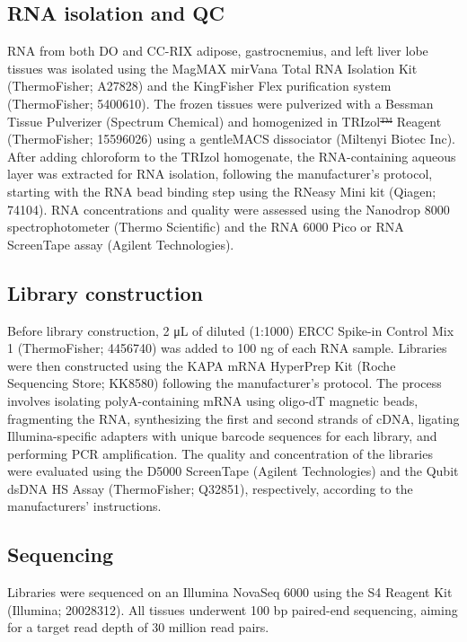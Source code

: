 \documentclass[
]{article}
\providecommand{\DIFaddtex}[1]{{\protect\color{blue}\uwave{#1}}} %
\providecommand{\DIFdeltex}[1]{{\protect\color{red}\sout{#1}}}                      %
\providecommand{\DIFaddbegin}{} %
\providecommand{\DIFaddend}{} %
\providecommand{\DIFdelbegin}{} %
\providecommand{\DIFdelend}{} %
\providecommand{\DIFadd}[1]{\texorpdfstring{\DIFaddtex{#1}}{#1}} %
\providecommand{\DIFdel}[1]{\texorpdfstring{\DIFdeltex{#1}}{}} %
\newcommand{\DIFscaledelfig}{0.5}
\newlength{\DIFdelgraphicswidth} %
\newlength{\DIFdelgraphicsheight} %
\newcommand{\DIFaddincludegraphics}[2][]{{\color{blue}\fbox{\DIFOincludegraphics[#1]{#2}}}} %
\newcommand{\DIFdelincludegraphics}[2][]{%
\sbox{\DIFdelgraphicsbox}{\DIFOincludegraphics[#1]{#2}}%
\settoboxwidth{\DIFdelgraphicswidth}{\DIFdelgraphicsbox} %
\settoboxtotalheight{\DIFdelgraphicsheight}{\DIFdelgraphicsbox} %
\scalebox{\DIFscaledelfig}{%
\parbox[b]{\DIFdelgraphicswidth}{\usebox{\DIFdelgraphicsbox}\\[-\baselineskip] \rule{\DIFdelgraphicswidth}{0em}}\llap{\resizebox{\DIFdelgraphicswidth}{\DIFdelgraphicsheight}{%
\setlength{\unitlength}{\DIFdelgraphicswidth}%
\begin{picture}(1,1)%
\thicklines\linethickness{2pt} %
{\color[rgb]{1,0,0}\put(0,0){\framebox(1,1){}}}%
{\color[rgb]{1,0,0}\put(0,0){\line( 1,1){1}}}%
{\color[rgb]{1,0,0}\put(0,1){\line(1,-1){1}}}%
\end{picture}%
}\hspace*{3pt}}} %
} %
\DeclareRobustCommand{\DIFaddbegin}{\DIFOaddbegin \let\includegraphics\DIFaddincludegraphics} %
\DeclareRobustCommand{\DIFaddend}{\DIFOaddend \let\includegraphics\DIFOincludegraphics} %
\DeclareRobustCommand{\DIFdelbegin}{\DIFOdelbegin \let\includegraphics\DIFdelincludegraphics} %
\DeclareRobustCommand{\DIFdelend}{\DIFOaddend \let\includegraphics\DIFOincludegraphics} %
\begin{document}
\subsection{RNA isolation and QC}\label{rna-isolation-and-qc}

RNA from both DO and CC-RIX adipose, gastrocnemius, and left liver lobe
tissues was isolated using the MagMAX mirVana Total RNA Isolation Kit
(ThermoFisher; A27828) and the KingFisher Flex purification system
(ThermoFisher; 5400610). The frozen tissues were pulverized with a
Bessman Tissue Pulverizer (Spectrum Chemical) and homogenized in
TRIzol\DIFdelbegin \DIFdel{™
}\DIFdelend \DIFaddbegin \DIFadd{\textsuperscript{\texttrademark} }\DIFaddend Reagent (ThermoFisher; 15596026)
using a gentleMACS dissociator (Miltenyi Biotec Inc). After adding
chloroform to the TRIzol homogenate, the RNA-containing aqueous layer
was extracted for RNA isolation, following the manufacturer's protocol,
starting with the RNA bead binding step using the RNeasy Mini kit
(Qiagen; 74104). RNA concentrations and quality were assessed using the
Nanodrop 8000 spectrophotometer (Thermo Scientific) and the RNA 6000
Pico or RNA ScreenTape assay (Agilent Technologies).

\subsection{Library construction}\label{library-construction}

Before library construction, 2 \si{\micro\liter} of diluted (1:1000)
ERCC Spike-in Control Mix 1 (ThermoFisher; 4456740) was added to 100 ng
of each RNA sample. Libraries were then constructed using the KAPA mRNA
HyperPrep Kit (Roche Sequencing Store; KK8580) following the
manufacturer's protocol. The process involves isolating polyA-containing
mRNA using oligo-dT magnetic beads, fragmenting the RNA, synthesizing
the first and second strands of cDNA, ligating Illumina-specific
adapters with unique barcode sequences for each library, and performing
PCR amplification. The quality and concentration of the libraries were
evaluated using the D5000 ScreenTape (Agilent Technologies) and the
Qubit dsDNA HS Assay (ThermoFisher; Q32851), respectively, according to
the manufacturers' instructions.

\subsection{Sequencing}\label{sequencing}

Libraries were sequenced on an Illumina NovaSeq 6000 using the S4
Reagent Kit (Illumina; 20028312). All tissues underwent 100 bp
paired-end sequencing, aiming for a target read depth of 30 million read
pairs.
\end{document}
